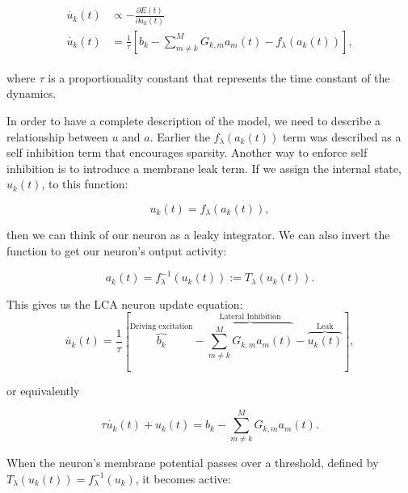 \begin{align}\label{eq:ch2_u_dot}
\begin{split}
    \dot{u_{k}}(t) &\propto - \frac{\partial E(t)} {\partial a_{k}(t)} \\
    \dot{u_{k}}(t) &= \frac{1}{\tau} \left[b_{k} - \sum_{m \neq k}^{M}G_{k,m}a_{m}(t) - f_{\lambda}(a_{k}(t)) \right],
\end{split}
\end{align}

\noindent where $\tau$ is a proportionality constant that represents the time constant of the dynamics.

In order to have a complete description of the model, we need to describe a relationship between $u$ and $a$. Earlier the $f_{\lambda}(a_{k}(t))$ term was described as a self inhibition term that encourages sparsity. Another way to enforce self inhibition is to introduce a membrane leak term. If we assign the internal state, $u_{k}(t)$, to this function:

\begin{equation}\label{eq:ch2_u_func_a}
    u_k(t) = f_{\lambda}(a_{k}(t)),
\end{equation}

\noindent then we can think of our neuron as a leaky integrator. We can also invert the function to get our neuron's output activity:

\begin{displaymath}\label{eq:ch2_a_fu_thresh}
    a_{k}(t) = f_{\lambda}^{-1}(u_{k}(t)) := T_{\lambda}(u_{k}(t)).
\end{displaymath}

This gives us the LCA neuron update equation:
\begin{equation}\label{eq:ch2_u_dot_full}
    \dot{u_{k}}(t) = \frac{1}{\tau} \left[\overbrace{b_{k}}^\text{Driving excitation} - \overbrace{\sum_{m \neq k}^{M}G_{k,m}a_{m}(t)}^\text{Lateral Inhibition} - \overbrace{u_{k}(t)}^\text{Leak} \right],
\end{equation}

\noindent or equivalently

\begin{displaymath}
    \tau \dot{u_{k}}(t) + u_{k}(t) =  b_{k} - \sum_{m \neq k}^{M}G_{k,m}a_{m}(t).
\end{displaymath}

When the neuron's membrane potential passes over a threshold, defined by $T_{\lambda}(u_{k}(t)) = f_{\lambda}^{-1}(u_{k})$, it becomes active:

